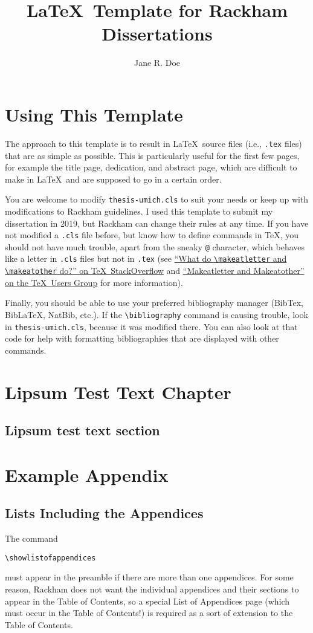 \documentclass[thesis]{thesis-umich}
\title{\LaTeX~Template for Rackham Dissertations}
\author{Jane R. Doe}
\begin{document}
\chapter{Using This Template}
The approach to this template is to result in \LaTeX~source files (i.e.,
\texttt{.tex} files) that are as simple as possible.  This is particularly
useful for the first few pages, for example the title page, dedication, and
abstract page, which are difficult to make in \LaTeX~and are supposed to go in
a certain order.

You are welcome to modify \texttt{thesis-umich.cls} to suit your needs or keep
up with modifications to Rackham guidelines. I used this template to submit my
dissertation in 2019, but Rackham can change their rules at any time. If you
have not modified a \texttt{.cls} file before, but know how to define commands
in \TeX, you should not have much trouble, apart from the sneaky \verb=@=
character, which behaves like a letter in \texttt{.cls} files but not in
\texttt{.tex} (see \href{https://tex.stackexchange.com/q/8351/21027}{``What do
  \texttt{\textbackslash makeatletter} and \texttt{\textbackslash makeatother}
do?'' on \TeX\ StackOverflow} and
\href{https://tug.org/pipermail/tugindia/2002-January/000178.html}{``Makeatletter
and Makeatother'' on the \TeX\ Users Group} for more information).

Finally, you should be able to use your preferred bibliography manager (BibTex, BibLaTeX, NatBib, etc.). If the \texttt{\textbackslash bibliography} command is causing trouble, look in \texttt{thesis-umich.cls}, because it was modified there. You can also look at that code for help with formatting bibliographies that are displayed with other commands.

\chapter{Lipsum Test Text Chapter}
\section{Lipsum test text section}
\lipsum[1]


\appendix
\chapter{Example Appendix}

\section{Lists Including the Appendices}
The command
\begin{verbatim}
\showlistofappendices
\end{verbatim}
must appear in the preamble if there are more than one appendices.  For
some reason, Rackham does not want the individual appendices and their
sections to appear in the Table of Contents, so a special List of
Appendices page (which must occur in the Table of Contents!) is required
as a sort of extension to the Table of Contents.

\nocite{*}




\end{document}
